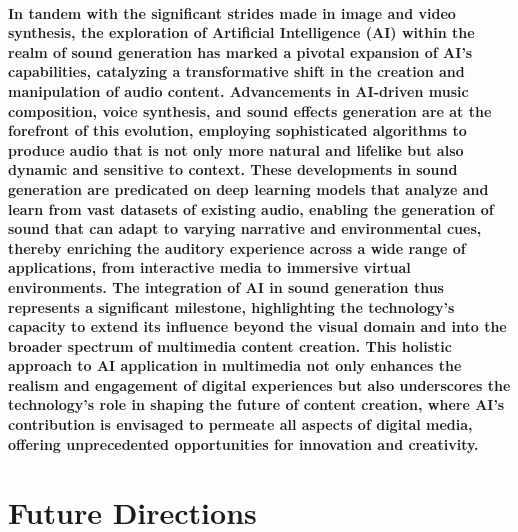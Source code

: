 \documentclass[11pt,a4paper,oneside]{report}
\begin{document}
\paragraph{In tandem with the significant strides made in image and video synthesis, the exploration of Artificial Intelligence (AI) within the realm of sound generation has marked a pivotal expansion of AI's capabilities, catalyzing a transformative shift in the creation and manipulation of audio content. Advancements in AI-driven music composition, voice synthesis, and sound effects generation are at the forefront of this evolution, employing sophisticated algorithms to produce audio that is not only more natural and lifelike but also dynamic and sensitive to context. These developments in sound generation are predicated on deep learning models that analyze and learn from vast datasets of existing audio, enabling the generation of sound that can adapt to varying narrative and environmental cues, thereby enriching the auditory experience across a wide range of applications, from interactive media to immersive virtual environments. The integration of AI in sound generation thus represents a significant milestone, highlighting the technology's capacity to extend its influence beyond the visual domain and into the broader spectrum of multimedia content creation. This holistic approach to AI application in multimedia not only enhances the realism and engagement of digital experiences but also underscores the technology's role in shaping the future of content creation, where AI's contribution is envisaged to permeate all aspects of digital media, offering unprecedented opportunities for innovation and creativity.}

\section{Future Directions}
\end{document}
